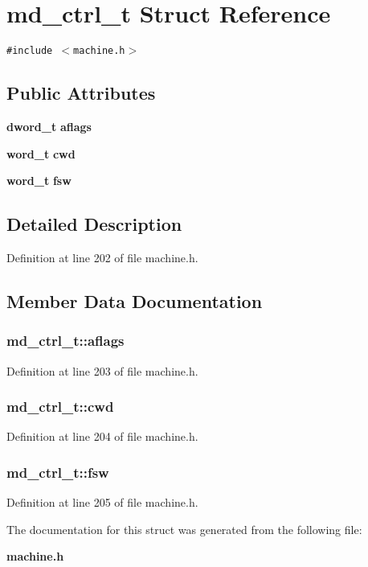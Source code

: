 \section{md\_\-ctrl\_\-t Struct Reference}
\label{structmd__ctrl__t}
{\tt \#include $<$machine.h$>$}

\subsection*{Public Attributes}
\begin{CompactItemize}
\item 
{\bf dword\_\-t} {\bf aflags}
\item 
{\bf word\_\-t} {\bf cwd}
\item 
{\bf word\_\-t} {\bf fsw}
\end{CompactItemize}


\subsection{Detailed Description}


Definition at line 202 of file machine.h.

\subsection{Member Data Documentation}
\subsubsection[{aflags}]{ {\bf md\_\-ctrl\_\-t::aflags}}\label{structmd__ctrl__t_d923ea6fa93332fa9e41da6b2401a0bc}




Definition at line 203 of file machine.h.
\subsubsection[{cwd}]{ {\bf md\_\-ctrl\_\-t::cwd}}\label{structmd__ctrl__t_26a6b1e138ad9b89d0c51ad9ff11021f}




Definition at line 204 of file machine.h.
\subsubsection[{fsw}]{ {\bf md\_\-ctrl\_\-t::fsw}}\label{structmd__ctrl__t_7ddf70a462d6a6c27d3e7a76cf9ce4d8}




Definition at line 205 of file machine.h.

The documentation for this struct was generated from the following file:\begin{CompactItemize}
\item 
{\bf machine.h}\end{CompactItemize}
